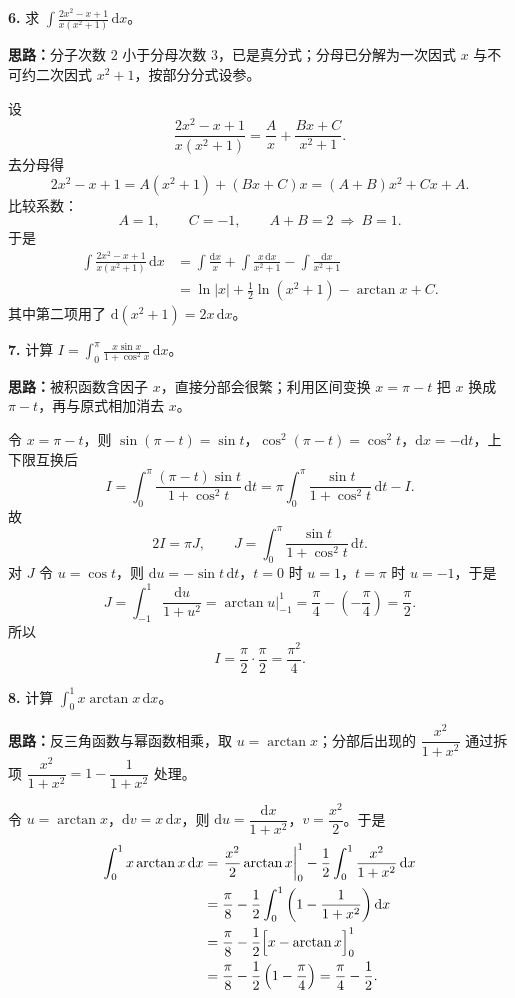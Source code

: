 \textbf{6.} 求 $\displaystyle\int\frac{2x^2-x+1}{x(x^2+1)}\,\mathrm dx$。

\ifshowsolutions%
\textbf{思路：}分子次数 $2$ 小于分母次数 $3$，已是真分式；分母已分解为一次因式 $x$ 与不可约二次因式 $x^2+1$，按部分分式设参。

设
\[
  \frac{2x^2-x+1}{x(x^2+1)}=\frac{A}{x}+\frac{Bx+C}{x^2+1}.
\]
去分母得
\[
  2x^2-x+1=A(x^2+1)+(Bx+C)x=(A+B)x^2+Cx+A.
\]
比较系数：
\[
  A=1,\qquad C=-1,\qquad A+B=2\ \Rightarrow\ B=1.
\]
于是
\[
\begin{aligned}
  \int\frac{2x^2-x+1}{x(x^2+1)}\,\mathrm dx
  &=\int\frac{\mathrm dx}{x}+\int\frac{x\,\mathrm dx}{x^2+1}-\int\frac{\mathrm dx}{x^2+1}\\
  &=\ln|x|+\frac12\ln(x^2+1)-\arctan x+C.
\end{aligned}
\]
其中第二项用了 $\mathrm d(x^2+1)=2x\,\mathrm dx$。

\else \answerarea[10] \fi%

\textbf{7.} 计算 $\displaystyle I=\int_{0}^{\pi}\frac{x\sin x}{1+\cos^2x}\,\mathrm dx$。

\ifshowsolutions%
\textbf{思路：}被积函数含因子 $x$，直接分部会很繁；利用区间变换 $x=\pi-t$ 把 $x$ 换成 $\pi-t$，再与原式相加消去 $x$。

令 $x=\pi-t$，则 $\sin(\pi-t)=\sin t$，$\cos^2(\pi-t)=\cos^2t$，$\mathrm dx=-\mathrm dt$，上下限互换后
\[
  I=\int_0^\pi\frac{(\pi-t)\sin t}{1+\cos^2t}\,\mathrm dt
   =\pi\int_0^\pi\frac{\sin t}{1+\cos^2t}\,\mathrm dt-I.
\]
故
\[
  2I=\pi J,\qquad J=\int_0^\pi\frac{\sin t}{1+\cos^2t}\,\mathrm dt.
\]
对 $J$ 令 $u=\cos t$，则 $\mathrm du=-\sin t\,\mathrm dt$，$t=0$ 时 $u=1$，$t=\pi$ 时 $u=-1$，于是
\[
  J=\int_{-1}^{1}\frac{\mathrm du}{1+u^2}
   =\arctan u\Big|_{-1}^{1}
   =\frac{\pi}{4}-\left(-\frac{\pi}{4}\right)=\frac{\pi}{2}.
\]
所以
\[
  I=\frac{\pi}{2}\cdot\frac{\pi}{2}=\frac{\pi^2}{4}.
\]

\else \answerarea[10] \fi%

\textbf{8.} 计算 $\displaystyle\int_{0}^{1}x\arctan x\,\mathrm dx$。

\ifshowsolutions%
\textbf{思路：}反三角函数与幂函数相乘，取 $u=\arctan x$；分部后出现的 $\dfrac{x^2}{1+x^2}$ 通过拆项 $\dfrac{x^2}{1+x^2}=1-\dfrac{1}{1+x^2}$ 处理。

令 $u=\arctan x$，$\mathrm dv=x\,\mathrm dx$，则 $\mathrm du=\dfrac{\mathrm dx}{1+x^2}$，$v=\dfrac{x^2}{2}$。于是
\[
\begin{aligned}
  \int_0^1 x\arctan x\,\mathrm dx
  &=\left.\frac{x^2}{2}\arctan x\right|_0^1
    -\frac12\int_0^1\frac{x^2}{1+x^2}\,\mathrm dx\\
  &=\frac{\pi}{8}-\frac12\int_0^1\left(1-\frac{1}{1+x^2}\right)\mathrm dx\\
  &=\frac{\pi}{8}-\frac12\Bigl[x-\arctan x\Bigr]_0^1\\
  &=\frac{\pi}{8}-\frac12\left(1-\frac{\pi}{4}\right)
   =\frac{\pi}{4}-\frac12.
\end{aligned}
\]

